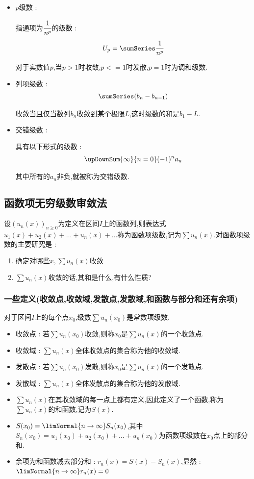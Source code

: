{{{{\begin{itemize}
{            他是发散的.
            }
      \item{
            $p$级数 :

            指通项为$\cfrac{1}{n^p}$的级数 :
            $$
              U_p = \sumSeries\cfrac{1}{n^p}
            $$

            对于实数值$p$,当$p > 1$时收敛,$p <= 1$时发散,$p = 1$时为调和级数.
            }
      \item{
            列项级数 :
            $$
              \sumSeries(b_n - b_{n - 1})
            $$

            收敛当且仅当数列$b_n$收敛到某个极限$L$,这时级数的和是$b_1 - L$.
            }
      \item{
            交错级数 :

            具有以下形式的级数 :
            $$
              \upDownSum{\infty}{n = 0}(-1)^na_n
            $$

            其中所有的$a_n$非负,就被称为交错级数.
            }
    \end{itemize}

  }%

}%

\subsection{函数项无穷级数审敛法}{
设$(u_n(x))_{n \geq 0}$为定义在区间$I$上的函数列,则表达式$u_1(x) + u_2(x) + \dots + u_n(x) + \dots$称为函数项级数,记为$\sum u_n(x)$.对函数项级数的主要研究是 :
\begin{enumerate}
  \item 确定对哪些$x,\sum u_n(x)$收敛
  \item $\sum u_n(x)$收敛的话,其和是什么,有什么性质?
\end{enumerate}

\subsubsection{一些定义(收敛点,收敛域,发散点,发散域,和函数与部分和还有余项)}{
  对于区间$I$上的每个点$x_0$,级数$\sum u_n(x_0)$是常数项级数.
  \begin{itemize}
    \item 收敛点 : 若$\sum u_n(x_0)$收敛,则称$x_0$是$\sum u_n(x)$的一个收敛点.
    \item 收敛域 : $\sum u_n(x)$全体收敛点的集合称为他的收敛域.
    \item 发散点 : 若$\sum u_n(x_0)$发散,则称$x_0$是$\sum u_n(x)$的一个发散点.
    \item 发散域 : $\sum u_n(x)$全体发散点的集合称为他的发散域.
    \item $\sum u_n(x)$在其收敛域的每一点上都有定义,因此定义了一个函数,称为$\sum u_n(x)$的和函数,记为$S(x)$.
    \item $S(x_0) = \limNormal{n \to \infty}S_n(x_0)$,其中$S_n(x_0) = u_1(x_0) + u_2(x_0) + \dots + u_n(x_0)$为函数项级数在$x_0$点上的部分和.
    \item 余项为和函数减去部分和 : $r_n(x) = S(x) - S_n(x)$,显然 : $\limNormal{n \to \infty} r_n(x) = 0$
  \end{itemize}
}%

}}}

